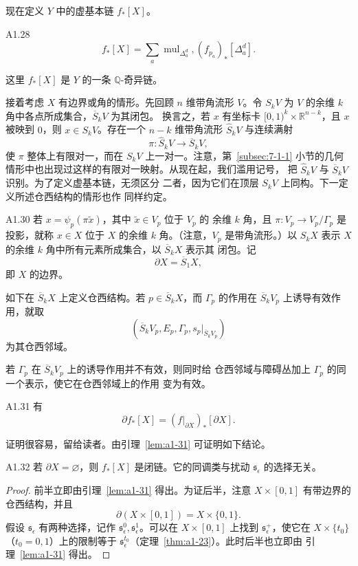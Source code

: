 现在定义 $Y$ 中的虚基本链 $f_*[X]$。

\begin{definition}{A1.28}\label{def:a1-28}
%
\begin{equation}
 f_*[X]=\sum_a
 \operatorname{mul}_{\Delta_a^d},(f_{p_a})_*[\Delta_a^d].
 \tag{A1.29}\label{eq:a1-29}
\end{equation}
\end{definition}
这里 $f_*[X]$ 是 $Y$ 的一条 $\mathbb Q$-奇异链。

接着考虑 $X$ 有边界或角的情形。先回顾 $n$ 维带角流形 $V$。令
$S_kV$ 为 $V$ 的余维 $k$ 角中各点所成集合，$\overline S_kV$ 为其闭包。
换言之，若 $x$ 有坐标卡 $[0,1)^k\times\mathbb R^{n-k}$，且 $x$ 被映到
$0$，则 $x\in S_kV$。存在一个 $n-k$ 维带角流形
$\widehat S_kV$ 与连续满射
\[
 \pi\colon\widehat S_kV\longrightarrow\overline S_kV,
\]
使 $\pi$ 整体上有限对一，而在 $S_kV$ 上一对一。注意，第~\ref{subsec:7-1-1}
小节的几何情形中也出现过这样的有限对一映射。从现在起，我们滥用记号，
把 $\widehat S_kV$ 与 $\overline S_kV$ 识别。为了定义虚基本链，无须区分
二者，因为它们在顶层 $S_kV$ 上同构。下一定义所述仓西结构的情形也作
同样约定。

\begin{definition}{A1.30}\label{def:a1-30}
若 $x=\psi_p(\pi\widetilde x)$，其中 $\widetilde x\in V_p$ 位于 $V_p$ 的
余维 $k$ 角，且 $\pi\colon V_p\to V_p/\Gamma_p$ 是投影，就称
$x\in X$ 位于 $X$ 的余维 $k$ 角。（注意，$V_p$ 是带角流形。）以 $S_kX$
表示 $X$ 的余维 $k$ 角中所有元素所成集合，以 $\overline S_kX$ 表示其
闭包。记
\[
 \partial X=\overline S_1X,
\]
即 $X$ 的边界。

如下在 $\overline S_kX$ 上定义仓西结构。若
$p\in\overline S_kX$，而 $\Gamma_p$ 的作用在
$\overline S_kV_p$ 上诱导有效作用，就取
\[
 (\overline S_kV_p,E_p,\Gamma_p,
   s_p|_{\overline S_kV_p})
\]
为其仓西邻域。

若 $\Gamma_p$ 在 $\overline S_kV_p$ 上的诱导作用并不有效，则同时给
仓西邻域与障碍丛加上 $\Gamma_p$ 的同一个表示，使它在仓西邻域上的作用
变为有效。
\end{definition}

\begin{lemma}{A1.31}\label{lem:a1-31}
有
\[
 \partial f_*[X]=(f|_{\partial X})_*[\partial X].
\]
\end{lemma}
证明很容易，留给读者。由引理~\ref{lem:a1-31} 可证明如下结论。

\begin{lemma}{A1.32}\label{lem:a1-32}
若 $\partial X=\varnothing$，则 $f_*[X]$ 是闭链。它的同调类与扰动
$\mathfrak s_\epsilon$ 的选择无关。
\end{lemma}
\begin{proof}
前半立即由引理~\ref{lem:a1-31} 得出。为证后半，注意
$X\times[0,1]$ 有带边界的仓西结构，并且
\[
 \partial(X\times[0,1])=X\times\{0,1\}.
\]
假设 $\mathfrak s_\epsilon$ 有两种选择，记作
$\mathfrak s^0_\epsilon,\mathfrak s^1_\epsilon$。可以在
$X\times[0,1]$ 上找到 $\mathfrak s^+_\epsilon$，使它在
$X\times\{t_0\}$（$t_0=0,1$）上的限制等于
$\mathfrak s^{t_0}_\epsilon$（定理~\ref{thm:a1-23}）。此时后半也立即由
引理~\ref{lem:a1-31} 得出。
\end{proof}

